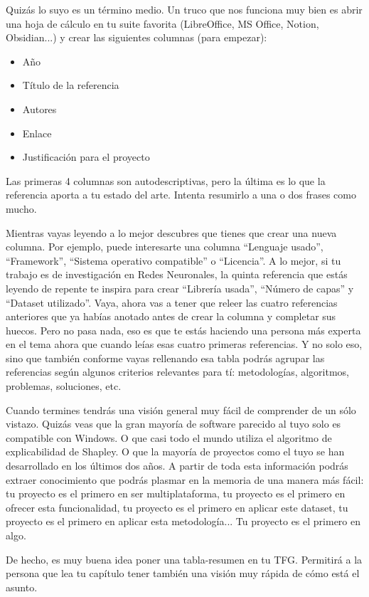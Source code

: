 Quizás lo suyo es un término medio. Un truco que nos funciona muy bien es abrir una hoja de cálculo en tu suite favorita (LibreOffice, MS Office, Notion, Obsidian...) y crear las siguientes columnas (para empezar):
\begin{itemize}
    \item Año
\item Título de la referencia
\item Autores
\item Enlace
\item Justificación para el proyecto
\end{itemize}

Las primeras 4 columnas son autodescriptivas, pero la última es lo que la referencia aporta a tu estado del arte. Intenta resumirlo a una o dos frases como mucho.

Mientras vayas leyendo a lo mejor descubres que tienes que crear una nueva columna. Por ejemplo, puede interesarte una columna ``Lenguaje usado'', ``Framework'', ``Sistema operativo compatible'' o ``Licencia''. A lo mejor, si tu trabajo es de investigación en Redes Neuronales, la quinta referencia que estás leyendo de repente te inspira para crear ``Librería usada'', ``Número de capas'' y ``Dataset utilizado''. Vaya, ahora vas a tener que releer las cuatro referencias anteriores que ya habías anotado antes de crear la columna y completar sus huecos. Pero no pasa nada, eso es que te estás haciendo una persona más experta en el tema ahora que cuando leías esas cuatro primeras referencias. Y no solo eso, sino que también conforme vayas rellenando esa tabla podrás agrupar las referencias según algunos criterios relevantes para tí: metodologías, algoritmos, problemas, soluciones, etc.

Cuando termines tendrás una visión general muy fácil de comprender de un sólo vistazo. Quizás veas que la gran mayoría de software parecido al tuyo solo es compatible con Windows. O que casi todo el mundo utiliza el algoritmo de explicabilidad de Shapley. O que la mayoría de proyectos como el tuyo se han desarrollado en los últimos dos años. A partir de toda esta información podrás extraer conocimiento que podrás plasmar en la memoria de una manera más fácil: tu proyecto es el primero en ser multiplataforma, tu proyecto es el primero en ofrecer esta funcionalidad, tu proyecto es el primero en aplicar este dataset, tu proyecto es el primero en aplicar esta metodología... Tu proyecto es el primero en algo.

De hecho, es muy buena idea poner una tabla-resumen en tu TFG. Permitirá a la persona que lea tu capítulo tener también una visión muy rápida de cómo está el asunto.

